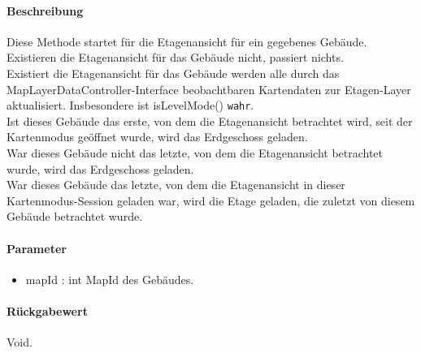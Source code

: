 \paragraph*{Beschreibung}
Diese Methode startet für die Etagenansicht für ein gegebenes Gebäude.\\
Existieren die Etagenansicht für das Gebäude nicht, passiert nichts.\\
Existiert die Etagenansicht für das Gebäude werden alle durch das MapLayerDataController-Interface beobachtbaren 
Kartendaten zur Etagen-Layer aktualisiert. Insbesondere ist isLevelMode() \texttt{wahr}.\\
Ist dieses Gebäude das erste, von dem die Etagenansicht betrachtet wird, seit der Kartenmodus geöffnet wurde, 
wird das Erdgeschoss geladen.\\
War dieses Gebäude nicht das letzte, von dem die Etagenansicht betrachtet wurde, wird das Erdgeschoss geladen.\\
War dieses Gebäude das letzte, von dem die Etagenansicht in dieser Kartenmodus-Session geladen war, wird die 
Etage geladen, die zuletzt von diesem Gebäude betrachtet wurde.
\paragraph*{Parameter}
\begin{itemize}
    \item mapId : int MapId des Gebäudes.
\end{itemize}
\paragraph*{Rückgabewert}
Void.
